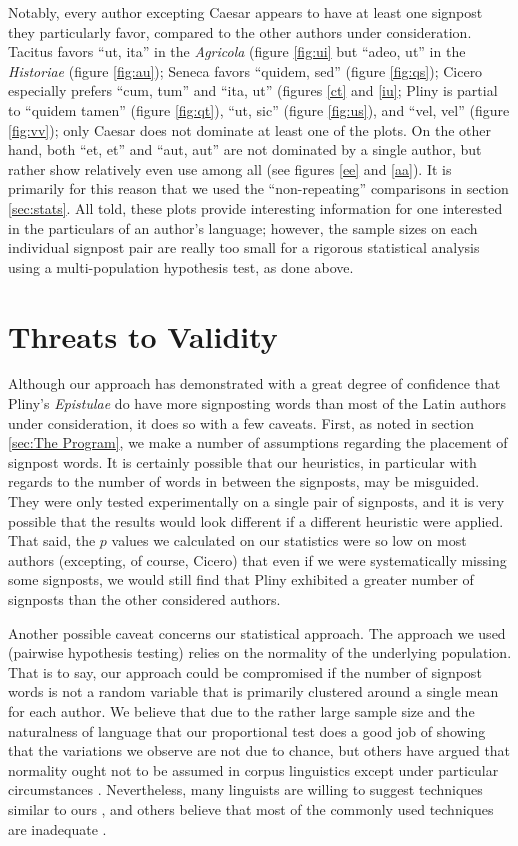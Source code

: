 Notably, every author excepting Caesar appears to have at least one signpost they particularly favor, compared to the other authors under consideration. Tacitus favors ``ut, ita'' in the \textit{Agricola} (figure \ref{fig:ui} but ``adeo, ut'' in the \textit{Historiae} (figure \ref{fig:au}); Seneca favors ``quidem, sed'' (figure \ref{fig:qs}); Cicero especially prefers ``cum, tum'' and ``ita, ut'' (figures \ref{ct} and \ref{iu}; Pliny is partial to ``quidem tamen'' (figure \ref{fig:qt}), ``ut, sic'' (figure \ref{fig:us}), and ``vel, vel'' (figure \ref{fig:vv}); only Caesar does not dominate at least one of the plots. On the other hand, both ``et, et'' and ``aut, aut'' are not dominated by a single author, but rather show relatively even use among all (see figures \ref{ee} and \ref{aa}). It is primarily for this reason that we used the ``non-repeating'' comparisons in section \ref{sec:stats}. All told, these plots provide interesting information for one interested in the particulars of an author's language; however, the sample sizes on each individual signpost pair are really too small for a rigorous statistical analysis using a multi-population hypothesis test, as done above.  

\section{Threats to Validity}
\label{sec:Threats to Validity}

Although our approach has demonstrated with a great degree of confidence that Pliny's \textit{Epistulae} do have more signposting words than most of the Latin authors under consideration, it does so with a few caveats. First, as noted in section \ref{sec:The Program}, we make a number of assumptions regarding the placement of signpost words. It is certainly possible that our heuristics, in particular with regards to the number of words in between the signposts, may be misguided. They were only tested experimentally on a single pair of signposts, and it is very possible that the results would look different if a different heuristic were applied. That said, the $p$ values we calculated on our statistics were so low on most authors (excepting, of course, Cicero) that even if we were systematically missing some signposts, we would still find that Pliny exhibited a greater number of signposts than the other considered authors.

Another possible caveat concerns our statistical approach. The approach we used (pairwise hypothesis testing) relies on the normality of the underlying population. That is to say, our approach could be compromised if the number of signpost words is not a random variable that is primarily clustered around a single mean for each author. We believe that due to the rather large sample size and the naturalness of language that our proportional test does a good job of showing that the variations we observe are not due to chance, but others have argued that normality ought not to be assumed in corpus linguistics except under particular circumstances \cite{chi2}. Nevertheless, many linguists are willing to suggest techniques similar to ours \cite{gries}, and others believe that most of the commonly used techniques are inadequate \cite{bestgen}.


